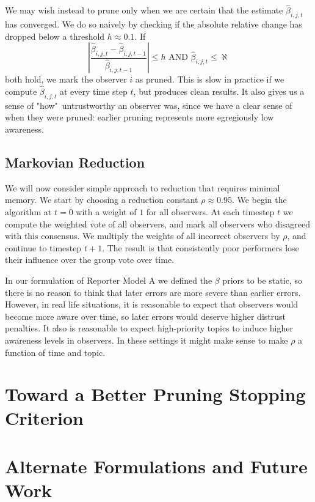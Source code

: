 \documentclass{amsart}
\theoremstyle{plain}
\numberwithin{equation}{section}
\begin{document}
We may wish instead to prune only when we are certain that the estimate $%
\hat{\beta}_{i,j,t}$ has converged. We do so naively by checking if the
absolute relative change has dropped below a threshold $h\approx 0.1$. If 
\begin{equation*}
\left\vert \frac{\hat{\beta}_{i,j,t}-\hat{\beta}_{i,j,t-1}}{\hat{\beta}%
_{i,j,t-1}}\right\vert \leq h\text{ AND }\hat{\beta}_{i,j,t}\leq \aleph 
\end{equation*}%
both hold, we mark the observer $i$ as pruned. This is slow in practice if
we compute $\hat{\beta}_{i,j,t}$ at every time step $t$, but produces clean
results. It also gives us a sense of "how"\ untrustworthy an observer was,
since we have a clear sense of when they were pruned: earlier pruning
represents more egregiously low awareness.

\subsection{Markovian Reduction}

We will now consider simple approach to reduction that requires minimal
memory. We start by choosing a reduction constant $\rho \approx 0.95$. We
begin the algorithm at $t=0$ with a weight of $1$ for all observers. At each
timestep $t$ we compute the weighted vote of all observers, and mark all
observers who disagreed with this consensus. We multiply the weights of all
incorrect observers by $\rho $, and continue to timestep $t+1$. The result
is that consistently poor performers lose their influence over the group
vote over time.

In our formulation of Reporter Model A we defined the $\beta $ priors to be
static, so there is no reason to think that later errors are more severe
than earlier errors. However, in real life situations, it is reasonable to
expect that observers would become more aware over time, so later errors
would deserve higher distrust penalties. It also is reasonable to expect
high-priority topics to induce higher awareness levels in observers. In
these settings it might make sense to make $\rho $ a function of time and
topic.

\section{Toward a Better Pruning Stopping Criterion}

\section{Alternate Formulations and Future Work}
\end{document}
